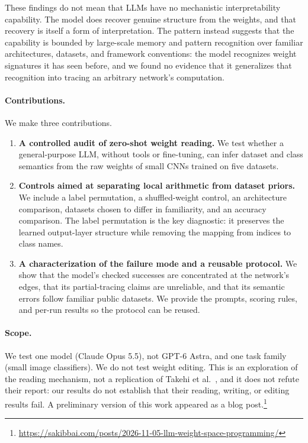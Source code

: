 \documentclass[11pt]{article}
\begin{document}
These findings do not mean that LLMs have no mechanistic interpretability capability. The model does recover genuine structure from the weights, and that recovery is itself a form of interpretation. The pattern instead suggests that the capability is bounded by large-scale memory and pattern recognition over familiar architectures, datasets, and framework conventions: the model recognizes weight signatures it has seen before, and we found no evidence that it generalizes that recognition into tracing an arbitrary network's computation.

\paragraph{Contributions.} We make three contributions.
\begin{enumerate}[leftmargin=*]
  \item \textbf{A controlled audit of zero-shot weight reading.} We test whether a general-purpose LLM, without tools or fine-tuning, can infer dataset and class semantics from the raw weights of small CNNs trained on five datasets.
  \item \textbf{Controls aimed at separating local arithmetic from dataset priors.} We include a label permutation, a shuffled-weight control, an architecture comparison, datasets chosen to differ in familiarity, and an accuracy comparison. The label permutation is the key diagnostic: it preserves the learned output-layer structure while removing the mapping from indices to class names.
  \item \textbf{A characterization of the failure mode and a reusable protocol.} We show that the model's checked successes are concentrated at the network's edges, that its partial-tracing claims are unreliable, and that its semantic errors follow familiar public datasets. We provide the prompts, scoring rules, and per-run results so the protocol can be reused.
\end{enumerate}

\paragraph{Scope.} We test one model (Claude Opus 5.5), not GPT-6 Astra, and one task family (small image classifiers). We do not test weight editing. This is an exploration of the reading mechanism, not a replication of Takehi et al.~\cite{takehi}, and it does not refute their report: our results do not establish that their reading, writing, or editing results fail. A preliminary version of this work appeared as a blog post.\footnote{\url{https://sakibbai.com/posts/2026-11-05-llm-weight-space-programming/}}
\end{document}
